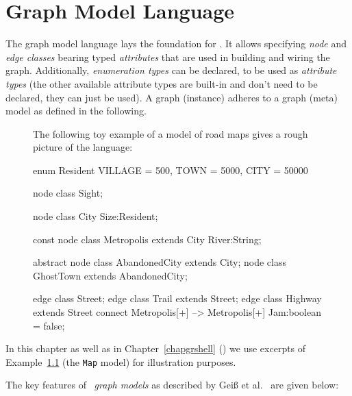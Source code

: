 \chapter{Graph Model Language}
\label{chapmodellang}
The graph model language lays the foundation for \GrG.
It allows specifying \emph{node} and \emph{edge classes} bearing typed \emph{attributes} that are used in building and wiring the graph. 
Additionally, \emph{enumeration types} can be declared, to be used as \emph{attribute types} (the other available attribute types are built-in and don't need to be declared, they can just be used).
A graph (instance) adheres to a graph (meta) model as defined in the following.

\begin{figure}[htbp]
\begin{example}\label{ex:model:map}
The following toy example of a model of road maps gives a rough picture of the language:
\begin{grgen}
enum Resident {VILLAGE = 500, TOWN = 5000, CITY = 50000}

node class Sight;

node class City {
  Size:Resident;
}

const node class Metropolis extends City {
  River:String;
}

abstract node class AbandonedCity extends City;
node class GhostTown extends AbandonedCity;

edge class Street;
edge class Trail extends Street;
edge class Highway extends Street
    connect Metropolis[+] --> Metropolis[+]
{
    Jam:boolean = false;
}
\end{grgen}
\end{example}
\end{figure}

In this chapter as well as in Chapter~\ref{chapgrshell} (\GrShell) we use excerpts of Example~\ref{ex:model:map} (the \texttt{Map} model) for illustration purposes.


The key features of \GrG\ \emph{graph models} as described by Geiß et al.~\cite{GBGHS:06,KG:07} are given below:

